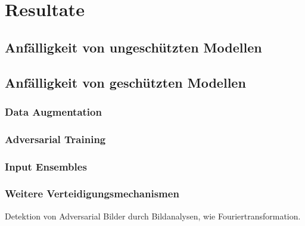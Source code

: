 \section{Resultate}

\subsection{Anfälligkeit von ungeschützten Modellen}

\subsection{Anfälligkeit von geschützten Modellen}

\subsubsection{Data Augmentation}

\subsubsection{Adversarial Training}

\subsubsection{Input Ensembles}

\subsubsection{Weitere Verteidigungsmechanismen}

Detektion von Adversarial Bilder durch Bildanalysen, wie Fouriertransformation. 

